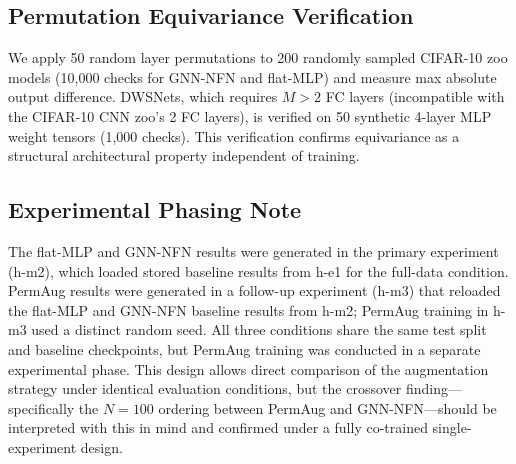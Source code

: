 \subsection{Permutation Equivariance Verification}

We apply 50 random layer permutations to 200 randomly sampled CIFAR-10 zoo models (10,000 checks for GNN-NFN and flat-MLP) and measure max absolute output difference. DWSNets, which requires $M{>}2$ FC layers (incompatible with the CIFAR-10 CNN zoo's 2 FC layers), is verified on 50 synthetic 4-layer MLP weight tensors (1,000 checks). This verification confirms equivariance as a structural architectural property independent of training.

\subsection{Experimental Phasing Note}

The flat-MLP and GNN-NFN results were generated in the primary experiment (h-m2), which loaded stored baseline results from h-e1 for the full-data condition. PermAug results were generated in a follow-up experiment (h-m3) that reloaded the flat-MLP and GNN-NFN baseline results from h-m2; PermAug training in h-m3 used a distinct random seed. All three conditions share the same test split and baseline checkpoints, but PermAug training was conducted in a separate experimental phase. This design allows direct comparison of the augmentation strategy under identical evaluation conditions, but the crossover finding---specifically the $N{=}100$ ordering between PermAug and GNN-NFN---should be interpreted with this in mind and confirmed under a fully co-trained single-experiment design.
